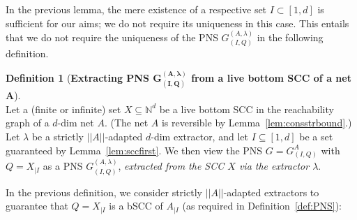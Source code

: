 \documentclass[11pt,a4paper]{amsart}
\newcommand{\nnorm}[1]{||#1||}
\newcommand{\Nat}{\mathbb{N}}
\newcommand{\restr}[1]{_{|{#1}}}
\newcommand{\setN}{\Nat}
\theoremstyle{plain}
\theoremstyle{definition}
\newtheorem{defi}[thm]{Definition}
\theoremstyle{defC}
\theoremstyle{thmC}
\begin{document}
\noindent
In the previous lemma, the mere existence of a respective set $I\subset[1,d]$
is sufficient for our aims; we do not require its uniqueness in
this case. This entails that we do not require the uniqueness of 
the PNS $G^{(A,\lambda)}_{(I,Q)}$ in the following definition.

\begin{defi}[\textbf{Extracting PNS
	$\bm{G^{(A,\lambda)}_{(I,Q)}}$ from a live bottom SCC of
	a net $\bm{A}$}]\label{def:extrPNS}
\hfill\\
Let a (finite or infinite) set $X\subseteq \setN^d$ be a live bottom SCC in the reachability graph of
	a $d$-dim net $A$. (The net $A$ is reversible by
	Lemma~\ref{lem:consstrbound}.)
	Let $\lambda$ be a strictly $\nnorm{A}$-adapted $d$-dim
extractor, and let $I\subseteq[1,d]$ be a set guaranteed by
Lemma~\ref{lem:sccfirst}. 
We then view the PNS $G=G^A_{(I,Q)}$ with  $Q=X\restr{I}$ as a PNS 
	$G^{(A,\lambda)}_{(I,Q)}$, \emph{extracted from the SCC $X$ via the extractor
	$\lambda$}.
\end{defi}


\noindent
In the previous definition, we consider strictly $\nnorm{A}$-adapted 
extractors to guarantee that $Q=X\restr{I}$ is a bSCC of $A\restr{I}$
(as required in Definition~\ref{def:PNS}):
\end{document}
